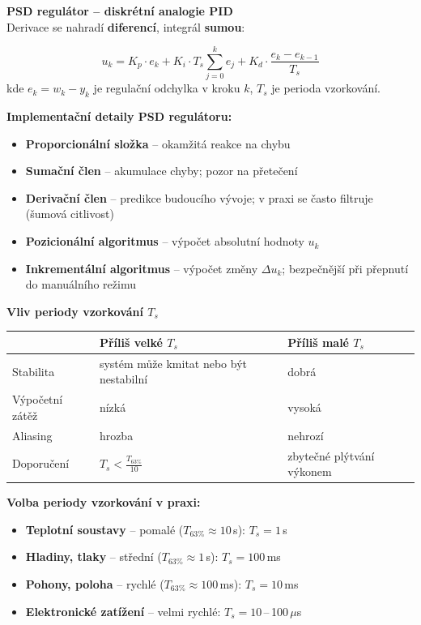 \documentclass[a4paper,10pt]{article}
\begin{document}
\begin{vysvetlenibox}
\textbf{PSD regulátor -- diskrétní analogie PID}\\
Derivace se nahradí \textbf{diferencí}, integrál \textbf{sumou}:

\begin{vzorcebox}
$$u_k = K_p \cdot e_k
+ K_i \cdot T_s \sum_{j=0}^{k} e_j
+ K_d \cdot \frac{e_k - e_{k-1}}{T_s}$$
kde $e_k = w_k - y_k$ je regulační odchylka v kroku $k$,
$T_s$ je perioda vzorkování.
\end{vzorcebox}

\textbf{Implementační detaily PSD regulátoru:}
\begin{itemize}[noitemsep, leftmargin=1.4em, topsep=4pt]
    \item \textbf{Proporcionální složka} -- okamžitá reakce na chybu
    \item \textbf{Sumační člen} -- akumulace chyby; pozor na přetečení
    \item \textbf{Derivační člen} -- predikce budoucího vývoje;
          v praxi se často filtruje (šumová citlivost)
    \item \textbf{Pozicionální algoritmus} -- výpočet absolutní hodnoty $u_k$
    \item \textbf{Inkrementální algoritmus} -- výpočet změny $\Delta u_k$;
          bezpečnější při přepnutí do manuálního režimu
\end{itemize}

\textbf{Vliv periody vzorkování $T_s$}

\begin{center}
\begin{tabularx}{0.95\linewidth}{@{} l X X @{}}
    \toprule
    & \textbf{Příliš velké $T_s$} & \textbf{Příliš malé $T_s$} \\
    \midrule
    Stabilita     & systém může kmitat nebo být nestabilní & dobrá \\
    Výpočetní zátěž & nízká & vysoká \\
    Aliasing      & hrozba & nehrozí \\
    Doporučení    & $T_s < \frac{T_{63\%}}{10}$
                  & zbytečné plýtvání výkonem \\
    \bottomrule
\end{tabularx}
\end{center}

\textbf{Volba periody vzorkování v praxi:}
\begin{itemize}[noitemsep, leftmargin=1.4em, topsep=4pt]
    \item \textbf{Teplotní soustavy} -- pomalé ($T_{63\%} \approx 10$\,s): $T_s = 1$\,s
    \item \textbf{Hladiny, tlaky} -- střední ($T_{63\%} \approx 1$\,s): $T_s = 100$\,ms
    \item \textbf{Pohony, poloha} -- rychlé ($T_{63\%} \approx 100$\,ms): $T_s = 10$\,ms
    \item \textbf{Elektronické zatížení} -- velmi rychlé: $T_s = 10$\,--\,100\,$\mu$s
\end{itemize}


\end{vysvetlenibox}
\end{document}
